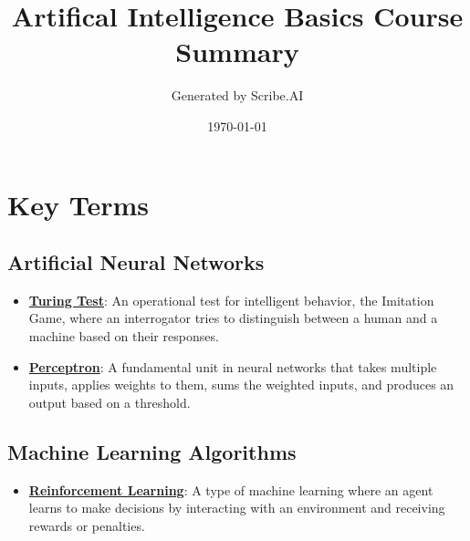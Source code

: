 \documentclass{article}%
\title{Artifical Intelligence Basics Course Summary}%
\author{Generated by Scribe.AI}%
\date{\today}%
\begin{document}
%
\normalsize%
\maketitle%
\section{Key Terms}%
\label{sec:KeyTerms}%
\subsection{Artificial Neural Networks}%
\label{subsec:ArtificialNeuralNetworks}%
\begin{itemize}[leftmargin=*]%
\item \href{\url{https://purdue.brightspace.com/d2l/common/assets/pdfjs-d2l-dist/1.0.14-legacy/web/viewer.html?file=\%252Fcontent\%252Fenforced\%252F1095467-wl.202510.CS.24300.001\%252F02L2-Intro.pdf\%253Fou\%253D1095467\&lang=en-us\&container=d2l-fileviewer-rendered-pdf\&fullscreen=d2l-fileviewer-rendered-pdf-dialog\&height=667}#page=6}{\textbf{Turing Test}}: An operational test for intelligent behavior, the Imitation Game, where an interrogator tries to distinguish between a human and a machine based on their responses.%
\item \href{\url{https://purdue.brightspace.com/d2l/common/assets/pdfjs-d2l-dist/1.0.14-legacy/web/viewer.html?file=\%252Fcontent\%252Fenforced\%252F1095467-wl.202510.CS.24300.001\%252F02L2-Intro.pdf\%253Fou\%253D1095467\&lang=en-us\&container=d2l-fileviewer-rendered-pdf\&fullscreen=d2l-fileviewer-rendered-pdf-dialog\&height=667}#page=45}{\textbf{Perceptron}}: A fundamental unit in neural networks that takes multiple inputs, applies weights to them, sums the weighted inputs, and produces an output based on a threshold.%
\end{itemize}

%
\subsection{Machine Learning Algorithms}%
\label{subsec:MachineLearningAlgorithms}%
\begin{itemize}[leftmargin=*]%
\item \href{\url{https://purdue.brightspace.com/d2l/common/assets/pdfjs-d2l-dist/1.0.14-legacy/web/viewer.html?file=\%252Fcontent\%252Fenforced\%252F1095467-wl.202510.CS.24300.001\%252F02L2-Intro.pdf\%253Fou\%253D1095467\&lang=en-us\&container=d2l-fileviewer-rendered-pdf\&fullscreen=d2l-fileviewer-rendered-pdf-dialog\&height=667}#page=46}{\textbf{Reinforcement Learning}}: A type of machine learning where an agent learns to make decisions by interacting with an environment and receiving rewards or penalties.%
\end{itemize}
\end{document}
